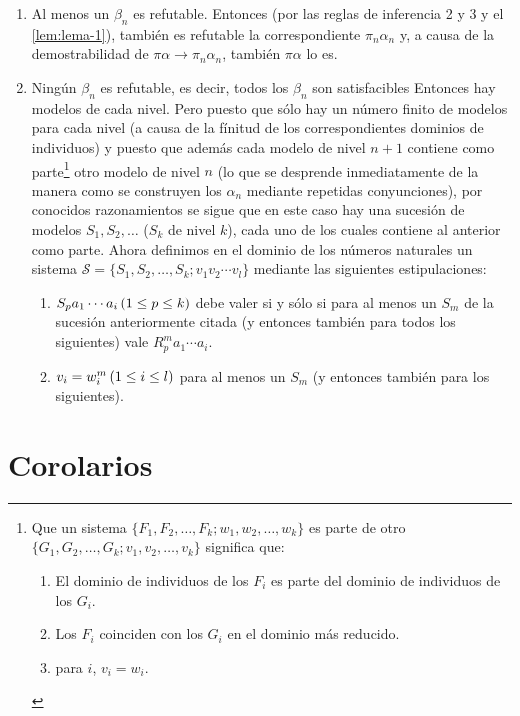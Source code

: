 \begin{enumerate}
    \item Al menos un $\beta_n$ es refutable. Entonces (por las reglas de inferencia 2 y 3 y el \autoref{lem:lema-1}), también es refutable la correspondiente $\pi_n \alpha_n$ y,
            a causa de la demostrabilidad de $\pi\alpha \rightarrow \pi_n \alpha_n$, también $\pi\alpha$ lo es.
    \item Ningún $\beta_n$ es refutable, es decir, todos los $\beta_n$ son satisfacibles Entonces hay modelos de cada nivel. Pero puesto que sólo hay un número finito de modelos 
    para cada nivel (a causa de la fínitud de los correspondientes dominios de individuos) y puesto que además cada modelo de nivel $n + 1$ contiene como parte\footnote{Que un 
    sistema $\{F_1, F_2, \dots, F_k ; w_1, w_2, \dots, w_k \}$ es parte de otro $\{G_1, G_2, \dots, G_k ; v_1, v_2, \dots, v_k \}$ significa que:
    \begin{enumerate}
        \item El dominio de individuos de los $F_i$ es parte del dominio de individuos de los $G_i$.
        \item Los $F_i$ coinciden con los $G_i$ en el dominio más reducido.
        \item para $i$, $v_i = w_i$.
    \end{enumerate}} 
    otro modelo de nivel $n$ (lo que se desprende inmediatamente de la manera como se construyen los $\alpha_n$ mediante repetidas conyunciones), por conocidos razonamientos se
    sigue que en este caso hay una sucesión de modelos $S_1, S_2, \dots$ ($S_k$ de nivel $k$), cada uno de los cuales contiene al anterior como parte. Ahora definimos en el dominio 
    de los números naturales un sistema $\mathcal{S} = \{S_1, S_2, \dots, S_k ; v_1 v_2 \cdots v_l\}$ mediante las siguientes estipulaciones:
    \begin{enumerate}
        \item $S_p a_1 \cdots a_i \thinspace (1 \leq p \leq k)$ debe valer si y sólo si para al menos un $S_m$ de la sucesión anteriormente citada (y entonces también para todos los 
                siguientes) vale $R_p^m a_1 \cdots a_i$.
        \item $v_i = w_i^m \thinspace (1 \leq i \leq l)$ para al menos un $S_m$ (y entonces también para los siguientes).
    \end{enumerate}
\end{enumerate}


\section{Corolarios}


